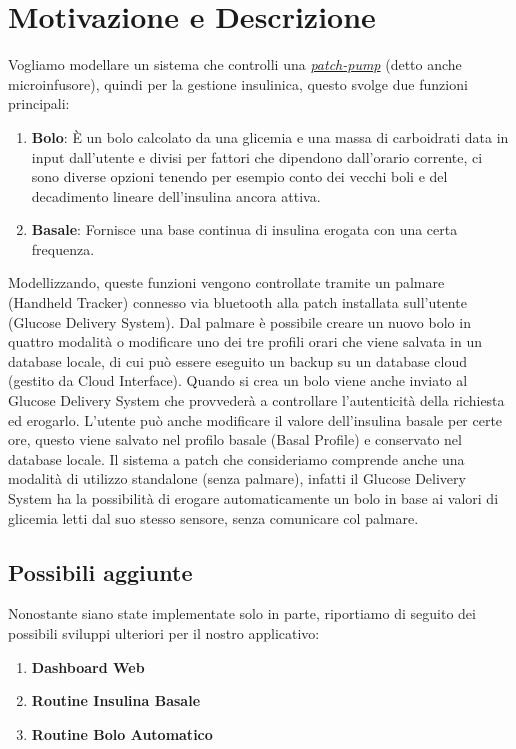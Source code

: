 \documentclass[twocolumn]{article}
\begin{document}
\section{Motivazione e Descrizione}
Vogliamo modellare un sistema che controlli una \href{https://it.wikipedia.org/wiki/Microinfusore}{\textit{patch-pump}} (detto anche microinfusore), quindi per la gestione insulinica, questo svolge due funzioni principali:
\begin{enumerate}
    \item \textbf{Bolo}: È un bolo calcolato da una glicemia e una massa di carboidrati data in input dall'utente e divisi per fattori che dipendono dall'orario corrente, ci sono diverse opzioni tenendo per esempio conto dei vecchi boli e del decadimento lineare dell'insulina ancora attiva.
    \item \textbf{Basale}: Fornisce una base continua di insulina erogata con una certa frequenza.
\end{enumerate}
Modellizzando, queste funzioni vengono controllate tramite un palmare (Handheld Tracker) connesso via bluetooth alla patch installata sull'utente (Glucose Delivery System).
Dal palmare è possibile creare un nuovo bolo in quattro modalità o modificare uno dei tre profili orari che viene salvata in un database locale, di cui può essere eseguito un backup su un database cloud (gestito da Cloud Interface).
Quando si crea un bolo viene anche inviato al Glucose Delivery System che provvederà a controllare l'autenticità della richiesta ed erogarlo.
L'utente può anche modificare il valore dell'insulina basale per certe ore, questo viene salvato nel profilo basale (Basal Profile) e conservato nel database locale.
Il sistema a patch che consideriamo comprende anche una modalità di utilizzo standalone (senza palmare), infatti il Glucose Delivery System ha la possibilità di erogare automaticamente un bolo in base ai valori di glicemia letti dal suo stesso sensore, senza comunicare col palmare.

\subsection{Possibili aggiunte}
Nonostante siano state implementate solo in parte, riportiamo di seguito dei possibili sviluppi ulteriori per il nostro applicativo:

\begin{enumerate}
    \setlength\itemsep{0em}
    \item \textbf{Dashboard Web}
    \item \textbf{Routine Insulina Basale}
    \item \textbf{Routine Bolo Automatico}
\end{enumerate}
\end{document}
